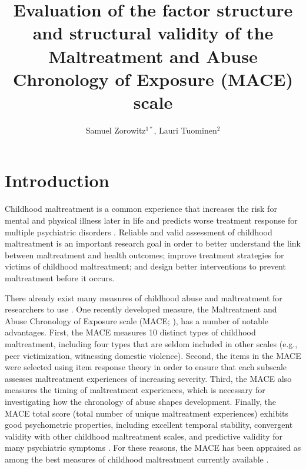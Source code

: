 \documentclass[letterpaper,man,natbib,longtable,floatsintext,12pt]{apa6}
\title{Evaluation of the factor structure and structural validity of the Maltreatment and Abuse Chronology of Exposure (MACE) scale}
\author{Samuel Zorowitz$^{1*}$, Lauri Tuominen$^{2}$}
\affiliation{$^1$Princeton Neuroscience Institute, Princeton University, USA\\$^2$The Royal’s Institute of Mental Health Research, University of Ottawa, Canada\\$^*$Corresponding author: zorowitz@princeton.edu}
\begin{document}
\maketitle

\section{Introduction}

Childhood maltreatment is a common experience \citep{stoltenborgh2015prevalence} that increases the risk for mental and physical illness  later in life \citep{kessler2010childhood, wegman2009meta} and predicts worse treatment response for multiple psychiatric disorders \citep{nanni2012childhood, thomas2019childhood}. Reliable and valid assessment of childhood maltreatment is an important research goal in order to better understand the link between maltreatment and health outcomes; improve treatment strategies for victims of childhood maltreatment; and design better interventions to prevent maltreatment before it occurs. 

There already exist many measures of childhood abuse and maltreatment for researchers to use \citep{saini2019systematic}. One recently developed measure, the Maltreatment and Abuse Chronology of Exposure scale (MACE; \citealt{teicher2015maltreatment}), has a number of notable advantages. First, the MACE measures 10 distinct types of childhood maltreatment, including four types that are seldom included in other scales (e.g., peer victimization, witnessing domestic violence). Second, the items in the MACE were selected using item response theory in order to ensure that each subscale assesses maltreatment experiences of increasing severity. Third, the MACE also measures the timing of maltreatment experiences, which is necessary for investigating how the chronology of abuse shapes development. Finally, the MACE total score (total number of unique maltreatment experiences) exhibits good psychometric properties, including excellent temporal stability, convergent validity with other childhood maltreatment scales, and predictive validity for many psychiatric symptoms \citep{teicher2015maltreatment}. For these reasons, the MACE has been appraised as among the best measures of childhood maltreatment currently available \citep{saini2019systematic, georgieva2022systematic}.
\end{document}

